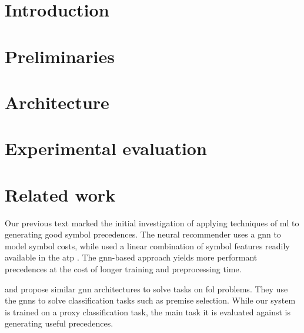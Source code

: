 \documentclass[runningheads]{llncs}
\begin{document}
\maketitle

\begin{abstract}

\end{abstract}

\section{Introduction}



\section{Preliminaries}
\label{sec:preliminaries}


\section{Architecture}
\label{sec:architecture}


\section{Experimental evaluation}
\label{sec:evaluation}


\section{Related work}
\label{sec:related}

Our previous text \cite{DBLP:conf/cade/Bartek020} marked the initial investigation of applying techniques of \gls{ml}
to generating good symbol precedences.
The neural recommender uses a \gls{gnn} to model symbol costs,
while \cite{DBLP:conf/cade/Bartek020} used a linear combination of symbol features readily available in the \gls{atp} \Vampire{}.
The \gls{gnn}-based approach yields more performant precedences at the cost of longer training and preprocessing time.

\cite{Olsak2019} and \cite{Rawson2020} propose similar \gls{gnn} architectures to solve tasks on \gls{fol} problems.
They use the \glspl{gnn} to solve classification tasks such as premise selection.
While our system is trained on a proxy classification task,
the main task it is evaluated against is generating useful precedences.
\end{document}
